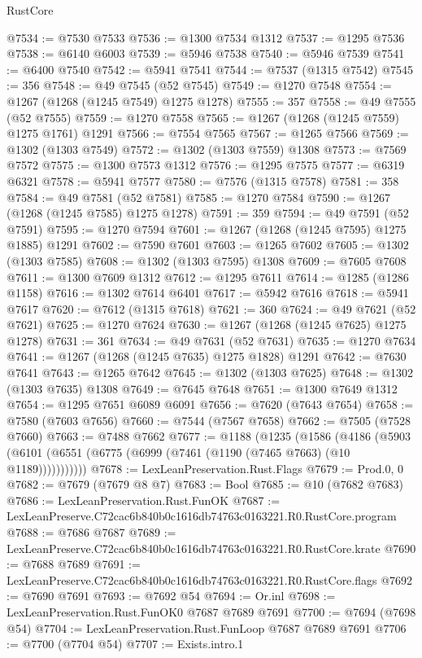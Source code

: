 \begin{lexlean}{RustCore}
\begin{coremodule}
@7534 := @7530 @7533
@7536 := @1300 @7534 @1312
@7537 := @1295 @7536
@7538 := @6140 @6003
@7539 := @5946 @7538
@7540 := @5946 @7539
@7541 := @6400 @7540
@7542 := @5941 @7541
@7544 := @7537 (@1315 @7542)
@7545 := 356
@7548 := @49 @7545 (@52 @7545)
@7549 := @1270 @7548
@7554 := @1267 (@1268 (@1245 @7549) @1275 @1278)
@7555 := 357
@7558 := @49 @7555 (@52 @7555)
@7559 := @1270 @7558
@7565 := @1267 (@1268 (@1245 @7559) @1275 @1761) @1291
@7566 := @7554 @7565
@7567 := @1265 @7566
@7569 := @1302 (@1303 @7549)
@7572 := @1302 (@1303 @7559) @1308
@7573 := @7569 @7572
@7575 := @1300 @7573 @1312
@7576 := @1295 @7575
@7577 := @6319 @6321
@7578 := @5941 @7577
@7580 := @7576 (@1315 @7578)
@7581 := 358
@7584 := @49 @7581 (@52 @7581)
@7585 := @1270 @7584
@7590 := @1267 (@1268 (@1245 @7585) @1275 @1278)
@7591 := 359
@7594 := @49 @7591 (@52 @7591)
@7595 := @1270 @7594
@7601 := @1267 (@1268 (@1245 @7595) @1275 @1885) @1291
@7602 := @7590 @7601
@7603 := @1265 @7602
@7605 := @1302 (@1303 @7585)
@7608 := @1302 (@1303 @7595) @1308
@7609 := @7605 @7608
@7611 := @1300 @7609 @1312
@7612 := @1295 @7611
@7614 := @1285 (@1286 @1158)
@7616 := @1302 @7614 @6401
@7617 := @5942 @7616
@7618 := @5941 @7617
@7620 := @7612 (@1315 @7618)
@7621 := 360
@7624 := @49 @7621 (@52 @7621)
@7625 := @1270 @7624
@7630 := @1267 (@1268 (@1245 @7625) @1275 @1278)
@7631 := 361
@7634 := @49 @7631 (@52 @7631)
@7635 := @1270 @7634
@7641 := @1267 (@1268 (@1245 @7635) @1275 @1828) @1291
@7642 := @7630 @7641
@7643 := @1265 @7642
@7645 := @1302 (@1303 @7625)
@7648 := @1302 (@1303 @7635) @1308
@7649 := @7645 @7648
@7651 := @1300 @7649 @1312
@7654 := @1295 @7651 @6089 @6091
@7656 := @7620 (@7643 @7654)
@7658 := @7580 (@7603 @7656)
@7660 := @7544 (@7567 @7658)
@7662 := @7505 (@7528 @7660)
@7663 := @7488 @7662
@7677 := @1188
    (@1235
      (@1586
        (@4186 (@5903 (@6101 (@6551 (@6775 (@6999 (@7461 (@1190 (@7465 @7663) (@10 @1189)))))))))))
@7678 := LexLeanPreservation.Rust.Flags
@7679 := Prod.{0, 0}
@7682 := @7679 (@7679 @8 @7)
@7683 := Bool
@7685 := @10 (@7682 @7683)
@7686 := LexLeanPreservation.Rust.FunOK
@7687 := LexLeanPreserve.C72cac6b840b0c1616db74763c0163221.R0.RustCore.program
@7688 := @7686 @7687
@7689 := LexLeanPreserve.C72cac6b840b0c1616db74763c0163221.R0.RustCore.krate
@7690 := @7688 @7689
@7691 := LexLeanPreserve.C72cac6b840b0c1616db74763c0163221.R0.RustCore.flags
@7692 := @7690 @7691
@7693 := @7692 @54
@7694 := Or.inl
@7698 := LexLeanPreservation.Rust.FunOK0 @7687 @7689 @7691
@7700 := @7694 (@7698 @54)
@7704 := LexLeanPreservation.Rust.FunLoop @7687 @7689 @7691
@7706 := @7700 (@7704 @54)
@7707 := Exists.intro.{1}

\end{coremodule}
\end{lexlean}
